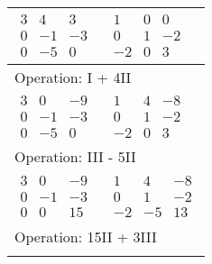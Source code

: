 \begin{longtable}{p{4cm}|p{3cm}}
    $\displaystyle\begin{matrix}
                          3 & 4  & 3  \\
                          0 & -1 & -3 \\
                          0 & -5 & 0
                      \end{matrix}$         &
    $\displaystyle\begin{matrix}
                          1  & 0 & 0  \\
                          0  & 1 & -2 \\
                          -2 & 0 & 3
                      \end{matrix}$                                                            \\\hline
    \multicolumn{2}{p{\dimexpr4cm+3cm+2\tabcolsep\relax}}{Operation: I + 4II}              \\\hline\pagebreak[0]

    $\displaystyle\begin{matrix}
                          3 & 0  & -9 \\
                          0 & -1 & -3 \\
                          0 & -5 & 0
                      \end{matrix}$         &
    $\displaystyle\begin{matrix}
                          1  & 4 & -8 \\
                          0  & 1 & -2 \\
                          -2 & 0 & 3
                      \end{matrix}$                                                            \\\hline
    \multicolumn{2}{p{\dimexpr4cm+3cm+2\tabcolsep\relax}}{Operation: III - 5II}            \\\hline\pagebreak[0]

    $\displaystyle\begin{matrix}
                          3 & 0  & -9 \\
                          0 & -1 & -3 \\
                          0 & 0  & 15
                      \end{matrix}$         &
    $\displaystyle\begin{matrix}
                          1  & 4  & -8 \\
                          0  & 1  & -2 \\
                          -2 & -5 & 13
                      \end{matrix}$                                                            \\\hline
    \multicolumn{2}{p{\dimexpr4cm+3cm+2\tabcolsep\relax}}{Operation: 15II + 3III}          \\\hline\pagebreak[0]


\end{longtable}
